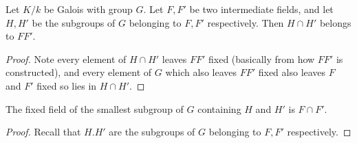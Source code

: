 \begin{corollary}
    Let $K/k$ be Galois with group $G$. Let $F,F'$ be two intermediate fields, and let $H,H'$ be the subgroups of $G$ belonging to $F,F'$ respectively. Then $H\cap H'$ belongs to $FF'$.
    \begin{proof}
        Note every element of $H\cap H'$ leaves $FF'$ fixed (basically from how $FF'$ is constructed), and every element of $G$ which also leaves $FF'$ fixed also leaves $F$ and $F'$ fixed so lies in $H\cap H'$.
    \end{proof}
\end{corollary}

\begin{corollary}
    The fixed field of the smallest subgroup of $G$ containing $H$ and $H'$ is $F\cap F'$.
    \begin{proof}
        Recall that $H.H'$ are the subgroups of $G$ belonging to $F,F'$ respectively.
    \end{proof} 
\end{corollary}

